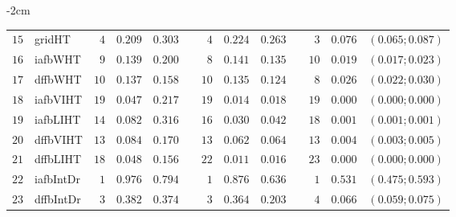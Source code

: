 \begin{table*}[!htbp]
\begin{adjustwidth*}{}{-2cm}
\begin{tabular}{@{}rlrrrrrrrrrcc@{}}
\footnotesize{$15$} & \footnotesize{gridHT   } & \footnotesize{$4 $} & \footnotesize{$0.209$} & \footnotesize{$0.303$} && \footnotesize{$4 $} & \footnotesize{$0.224$} & \footnotesize{$0.263$} && \footnotesize{$3 $} & \footnotesize{$0.076$} & \footnotesize{$(0.065;0.087)$} \\
\footnotesize{$16$} & \footnotesize{iafbWHT  } & \footnotesize{$9 $} & \footnotesize{$0.139$} & \footnotesize{$0.200$} && \footnotesize{$8 $} & \footnotesize{$0.141$} & \footnotesize{$0.135$} && \footnotesize{$10$} & \footnotesize{$0.019$} & \footnotesize{$(0.017;0.023)$} \\
\footnotesize{$17$} & \footnotesize{dffbWHT  } & \footnotesize{$10$} & \footnotesize{$0.137$} & \footnotesize{$0.158$} && \footnotesize{$10$} & \footnotesize{$0.135$} & \footnotesize{$0.124$} && \footnotesize{$8 $} & \footnotesize{$0.026$} & \footnotesize{$(0.022;0.030)$} \\
\footnotesize{$18$} & \footnotesize{iafbVIHT } & \footnotesize{$19$} & \footnotesize{$0.047$} & \footnotesize{$0.217$} && \footnotesize{$19$} & \footnotesize{$0.014$} & \footnotesize{$0.018$} && \footnotesize{$19$} & \footnotesize{$0.000$} & \footnotesize{$(0.000;0.000)$} \\
\footnotesize{$19$} & \footnotesize{iafbLIHT } & \footnotesize{$14$} & \footnotesize{$0.082$} & \footnotesize{$0.316$} && \footnotesize{$16$} & \footnotesize{$0.030$} & \footnotesize{$0.042$} && \footnotesize{$18$} & \footnotesize{$0.001$} & \footnotesize{$(0.001;0.001)$} \\
\footnotesize{$20$} & \footnotesize{dffbVIHT } & \footnotesize{$13$} & \footnotesize{$0.084$} & \footnotesize{$0.170$} && \footnotesize{$13$} & \footnotesize{$0.062$} & \footnotesize{$0.064$} && \footnotesize{$13$} & \footnotesize{$0.004$} & \footnotesize{$(0.003;0.005)$} \\
\footnotesize{$21$} & \footnotesize{dffbLIHT } & \footnotesize{$18$} & \footnotesize{$0.048$} & \footnotesize{$0.156$} && \footnotesize{$22$} & \footnotesize{$0.011$} & \footnotesize{$0.016$} && \footnotesize{$23$} & \footnotesize{$0.000$} & \footnotesize{$(0.000;0.000)$} \\
\footnotesize{$22$} & \footnotesize{iafbIntDr} & \footnotesize{$1 $} & \footnotesize{$0.976$} & \footnotesize{$0.794$} && \footnotesize{$1 $} & \footnotesize{$0.876$} & \footnotesize{$0.636$} && \footnotesize{$1 $} & \footnotesize{$0.531$} & \footnotesize{$(0.475;0.593)$} \\
\footnotesize{$23$} & \footnotesize{dffbIntDr} & \footnotesize{$3 $} & \footnotesize{$0.382$} & \footnotesize{$0.374$} && \footnotesize{$3 $} & \footnotesize{$0.364$} & \footnotesize{$0.203$} && \footnotesize{$4 $} & \footnotesize{$0.066$} & \footnotesize{$(0.059;0.075)$} \\

\end{tabular}
\end{adjustwidth*}
\end{table*}
